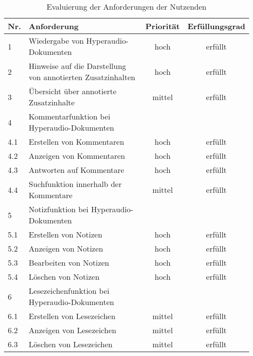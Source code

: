 \begin{table}[!ht]
\def\arraystretch{1.4}
\caption{Evaluierung der Anforderungen der Nutzenden}
\label{tab:EvalAnforderungenNutzenden}
\begin{tabularx}{\textwidth}{lXcc}      
    \hline
    Nr. & Anforderung & Priorität & Erfüllungsgrad
    \\\hline
    1 & Wiedergabe von Hyperaudio-Dokumenten & hoch & erfüllt\\
    2 & Hinweise auf die Darstellung von annotierten Zusatzinhalten & hoch & erfüllt\\
    3 & Übersicht über annotierte Zusatzinhalte & mittel & erfüllt\\
    4 & Kommentarfunktion bei Hyperaudio-Dokumenten & & \\
    4.1 & \hspace*{0.5cm} Erstellen von Kommentaren & hoch & erfüllt\\
    4.2 & \hspace*{0.5cm} Anzeigen von Kommentaren & hoch & erfüllt\\
    4.3 & \hspace*{0.5cm} Antworten auf Kommentare & hoch & erfüllt\\
    4.4 & \hspace*{0.5cm} Suchfunktion innerhalb der Kommentare & mittel & erfüllt\\ 
    5 & Notizfunktion bei Hyperaudio-Dokumenten & & \\
    5.1 & \hspace*{0.5cm} Erstellen von Notizen & hoch & erfüllt\\
    5.2 & \hspace*{0.5cm} Anzeigen von Notizen & hoch & erfüllt\\
    5.3 & \hspace*{0.5cm} Bearbeiten von Notizen & hoch & erfüllt\\
   	5.4 & \hspace*{0.5cm} Löschen von Notizen & hoch & erfüllt\\
    6 & Lesezeichenfunktion bei Hyperaudio-Dokumenten & & \\
    6.1 & \hspace*{0.5cm} Erstellen von Lesezeichen & mittel & erfüllt\\
    6.2 & \hspace*{0.5cm} Anzeigen von Lesezeichen & mittel & erfüllt\\
   	6.3 & \hspace*{0.5cm} Löschen von Lesezeichen & mittel & erfüllt\\

\end{tabularx}
\end{table}
